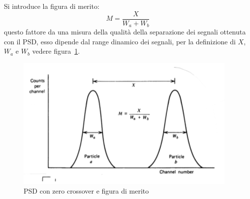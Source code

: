 Si introduce la figura di merito:
\begin{equation*}
M = \frac{X}{W_a + W_b}
\end{equation*}
questo fattore da una misura della qualit\`a della separazione dei segnali ottenuta con il PSD, esso dipende dal range dinamico dei segnali,
per la definizione di $X$, $W_a$ e $W_b$ vedere figura~\ref{fig:PSD}.
\begin{figure}[htbp]
\begin{center}
\includegraphics[scale=1]{./Immagini/PSD.png}
\caption{PSD con zero crossover e figura di merito}
\label{fig:PSD}
\end{center}
\end{figure}